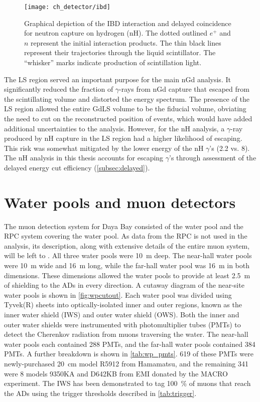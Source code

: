 \begin{figure}
    \centering
    \texttt{[image: ch\_detector/ibd]}
    \caption[Inverse Beta Decay diagram]{
        Graphical depiction of the IBD interaction and delayed coincidence
        for neutron capture on hydrogen (nH).
        The dotted outlined $e^+$ and $n$ represent the initial interaction products.
        The thin black lines represent their trajectories
        through the liquid scintillator.
        The ``whisker'' marks indicate production of scintillation light.
    }
    \label{fig:ibd_cartoon}
\end{figure}

The LS region served an important purpose for the main nGd \thetaot{} analysis.
It significantly reduced the fraction of $\gamma$-rays from nGd capture
that escaped from the scintillating volume and distorted the energy spectrum.
The presence of the LS region allowed the entire GdLS volume to be
the fiducial volume, obviating the need to cut on the reconstructed position
of events, which would have added additional uncertainties to the analysis.
However, for the nH analysis,
a $\gamma$-ray produced by nH capture in the LS region
had a higher likelihood of escaping.
This risk was somewhat mitigated by the lower energy of the nH $\gamma$'s
(\SI{2.2}{\mev} vs. \SI{8}{\mev}).
The nH \thetaot{} analysis in this thesis accounts for escaping $\gamma$'s
through assessment of the delayed energy cut efficiency (\cref{subsec:delayed}).


\section{Water pools and muon detectors}
\label{sec:wp}

The muon detection system for Daya Bay consisted of
the water pool and the RPC system covering the water pool.
As data from the RPC is not used in the \thetaot{} analysis,
its description, along with extensive details of the entire muon system,
will be left to \cite{muonsystem2015}.
All three water pools were \SI{10}{\m} deep.
The near-hall water pools were \SI{10}{\m} wide and \SI{16}{\m} long,
while the far-hall water pool was \SI{16}{\m} in both dimensions.
These dimensions allowed the water pools to provide at least \SI{2.5}{\m} of shielding
to the ADs in every direction.
A cutaway diagram of the near-site water pools is shown in \cref{fig:wpcutout}.
Each water pool was divided using Tyvek(R) sheets
into optically-isolated inner and outer regions,
known as the inner water shield (IWS) and outer water shield (OWS).
Both the inner and outer water shields were instrumented with photomultiplier tubes (PMTs)
to detect the Cherenkov radiation from muons traversing the water.
The near-hall water pools each contained \num{288} PMTs,
and the far-hall water pools contained \num{384} PMTs.
A further breakdown is shown in \cref{tab:wp_pmts}.
\num{619} of these PMTs were newly-purchased \SI{20}{\cm}
model R5912 from Hamamatsu,
and the remaining \num{341} were \SI{8}{\inch} models 9350KA
and D642KB from EMI
donated by the MACRO experiment.
The IWS has been demonstrated to tag \SI{100}{\percent} of muons
that reach the ADs using the trigger thresholds described in \cref{tab:trigger}.


